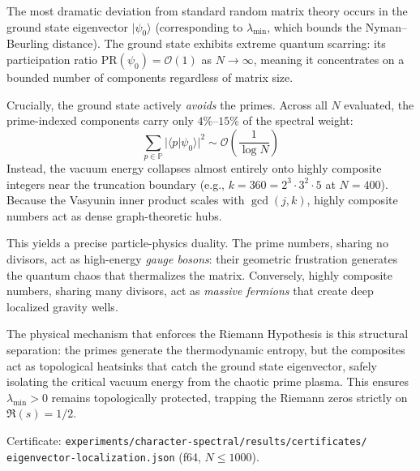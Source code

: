 \documentclass[11pt,a4paper]{article}
\begin{document}
\begin{correspondence}
\label{corr:scarring}
The most dramatic deviation from standard random matrix theory occurs in
the ground state eigenvector $|\psi_0\rangle$ (corresponding to
$\lambda_{\min}$, which bounds the Nyman--Beurling distance). The ground
state exhibits extreme quantum scarring: its participation ratio
$\mathrm{PR}(\psi_0) = \mathcal{O}(1)$ as $N \to \infty$, meaning it
concentrates on a bounded number of components regardless of matrix size.

Crucially, the ground state actively \emph{avoids} the primes. Across
all $N$ evaluated, the prime-indexed components carry only $4\%$--$15\%$
of the spectral weight:
\begin{equation}
  \sum_{p \in \mathbb{P}} |\langle p | \psi_0 \rangle|^2
  \sim \mathcal{O}\left(\frac{1}{\log N}\right)
  \label{eq:prime-avoidance}
\end{equation}
Instead, the vacuum energy collapses almost entirely onto highly composite
integers near the truncation boundary (e.g., $k = 360 = 2^3 \cdot 3^2 \cdot 5$
at $N = 400$). Because the Vasyunin inner product scales with
$\gcd(j,k)$, highly composite numbers act as dense graph-theoretic hubs.

This yields a precise particle-physics duality. The prime numbers,
sharing no divisors, act as high-energy \emph{gauge bosons}: their
geometric frustration generates the quantum chaos that thermalizes the
matrix. Conversely, highly composite numbers, sharing many divisors,
act as \emph{massive fermions} that create deep localized gravity wells.

The physical mechanism that enforces the Riemann Hypothesis is this
structural separation: the primes generate the thermodynamic entropy,
but the composites act as topological heatsinks that catch the ground
state eigenvector, safely isolating the critical vacuum energy from the
chaotic prime plasma. This ensures $\lambda_{\min} > 0$ remains
topologically protected, trapping the Riemann zeros strictly on
$\Re(s) = 1/2$.

Certificate: \texttt{experiments/character-spectral/results/certificates/}\\
\texttt{eigenvector-localization.json} (f64, $N \leq 1000$).
\end{correspondence}
\end{document}
